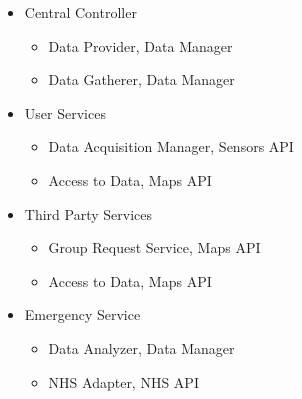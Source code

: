 \begin{itemize}
    \item Central Controller
    \begin{itemize}
        \item Data Provider, Data Manager
        \item Data Gatherer, Data Manager
    \end{itemize}
    \item User Services
    \begin{itemize}
        \item Data Acquisition Manager, Sensors API
        \item Access to Data, Maps API
    \end{itemize}
    \item Third Party Services
    \begin{itemize}
        \item Group Request Service, Maps API
        \item Access to Data, Maps API
    \end{itemize}
    \clearpage
    \item Emergency Service
    \begin{itemize}
        \item Data Analyzer, Data Manager
        \item NHS Adapter, NHS API
    \end{itemize}
\end{itemize}


